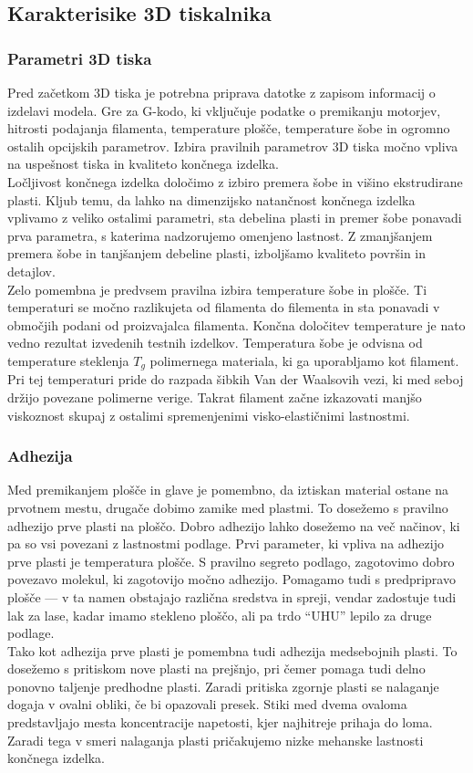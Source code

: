 \documentclass[12pt]{report}
\begin{document}
\subsection{Karakterisike 3D tiskalnika}
\subsubsection{Parametri 3D tiska}
Pred začetkom 3D tiska je potrebna priprava datotke z zapisom informacij o izdelavi modela. Gre za G-kodo, ki vključuje podatke o premikanju motorjev, hitrosti podajanja filamenta, temperature plošče, temperature šobe in ogromno ostalih opcijskih parametrov.
Izbira pravilnih parametrov 3D tiska močno vpliva na uspešnost tiska in kvaliteto končnega izdelka. \\
Ločljivost končnega izdelka določimo z izbiro premera šobe in višino ekstrudirane plasti. Kljub temu, da lahko na dimenzijsko natančnost končnega izdelka vplivamo z veliko ostalimi parametri, sta debelina plasti in premer šobe ponavadi prva parametra, s katerima nadzorujemo
omenjeno lastnost. Z zmanjšanjem premera šobe in tanjšanjem debeline plasti, izboljšamo kvaliteto površin in detajlov. \cite{redwood20173d}
\\
Zelo pomembna je predvsem pravilna izbira temperature šobe in plošče. Ti temperaturi se močno razlikujeta od filamenta do filementa in sta ponavadi v območjih podani od proizvajalca filamenta. Končna določitev temperature je nato vedno rezultat 
izvedenih testnih izdelkov. Temperatura šobe je odvisna od temperature steklenja $T_g$ polimernega materiala, ki ga uporabljamo kot filament. Pri tej temperaturi pride do razpada šibkih Van der Waalsovih vezi, ki med seboj držijo povezane polimerne verige. Takrat filament začne izkazovati
manjšo viskoznost skupaj z ostalimi spremenjenimi visko-elastičnimi lastnostmi.

\subsubsection{Adhezija}
Med premikanjem plošče in glave je pomembno, da iztiskan material ostane na prvotnem mestu, drugače dobimo zamike med plastmi. To dosežemo s pravilno adhezijo prve plasti na ploščo. Dobro adhezijo lahko dosežemo na več načinov, ki pa so vsi povezani z lastnostmi podlage.
Prvi parameter, ki vpliva na adhezijo prve plasti je temperatura plošče. S pravilno segreto podlago, zagotovimo dobro povezavo molekul, ki zagotovijo močno adhezijo. Pomagamo tudi s predpripravo plošče --- v ta namen obstajajo
različna sredstva in spreji, vendar zadostuje tudi lak za lase, kadar imamo stekleno ploščo, ali pa trdo ``UHU'' lepilo za druge podlage. \\
Tako kot adhezija prve plasti je pomembna tudi adhezija medsebojnih plasti. To dosežemo s pritiskom nove plasti na prejšnjo, pri čemer pomaga tudi delno ponovno taljenje predhodne plasti. Zaradi pritiska zgornje plasti se nalaganje dogaja v ovalni obliki, če bi opazovali presek. Stiki med dvema ovaloma predstavljajo mesta koncentracije napetosti, kjer najhitreje prihaja do loma. \cite{redwood20173d} Zaradi tega v smeri nalaganja plasti pričakujemo 
nizke mehanske lastnosti končnega izdelka.
\end{document}

